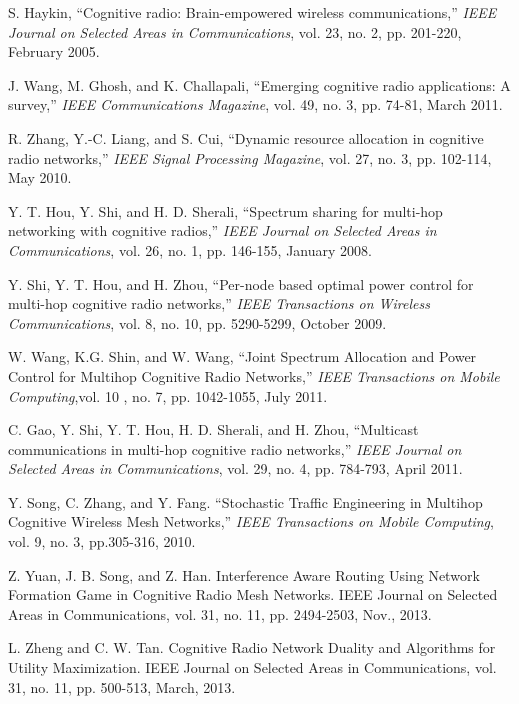 \documentclass[12pt,onecolumn,tworows]{IEEEtran}
\begin{document}
\begin{thebibliography}{1}
\baselineskip 14pt
S. Haykin, ``Cognitive radio: Brain-empowered wireless communications,'' {\em IEEE Journal on Selected Areas in Communications}, vol. 23, no. 2, pp. 201-220, February 2005.

J. Wang, M. Ghosh, and K. Challapali, ``Emerging cognitive radio applications: A survey,'' {\em IEEE Communications Magazine}, vol. 49, no. 3, pp. 74-81, March 2011.





R. Zhang, Y.-C. Liang, and S. Cui, ``Dynamic resource allocation in cognitive radio networks,'' {\em IEEE Signal Processing Magazine}, vol. 27, no. 3, pp. 102-114, May 2010.


Y. T. Hou, Y. Shi, and H. D. Sherali, ``Spectrum sharing for multi-hop networking with cognitive radios,'' {\em IEEE Journal on Selected Areas in Communications}, vol. 26, no. 1, pp. 146-155, January 2008.

Y. Shi, Y. T. Hou, and H. Zhou, ``Per-node based optimal power control for multi-hop cognitive radio networks,'' {\em IEEE Transactions on Wireless Communications}, vol. 8, no. 10, pp. 5290-5299, October 2009.

W. Wang, K.G. Shin, and W. Wang, ``Joint Spectrum Allocation and Power Control for Multihop Cognitive Radio Networks,'' {\em IEEE Transactions on Mobile Computing},vol. 10 , no. 7, pp. 1042-1055, July 2011.

C. Gao, Y. Shi, Y. T. Hou, H. D. Sherali, and H. Zhou, ``Multicast communications in multi-hop cognitive radio networks,'' {\em IEEE Journal on Selected Areas in Communications}, vol. 29, no. 4, pp. 784-793, April 2011.



Y. Song, C. Zhang, and Y. Fang. ``Stochastic Traffic Engineering in Multihop Cognitive Wireless Mesh
Networks,'' {\em IEEE Transactions on Mobile Computing}, vol. 9, no. 3, pp.305-316, 2010.

Z. Yuan, J. B. Song, and Z. Han.
Interference Aware Routing Using Network Formation Game in Cognitive Radio Mesh Networks.
IEEE Journal on Selected Areas in Communications, vol. 31, no. 11, pp. 2494-2503, Nov., 2013.

L. Zheng and C. W. Tan. Cognitive Radio Network Duality and Algorithms for Utility Maximization.
IEEE Journal on Selected Areas in Communications, vol. 31, no. 11, pp. 500-513, March, 2013.


\end{thebibliography}
\end{document}
